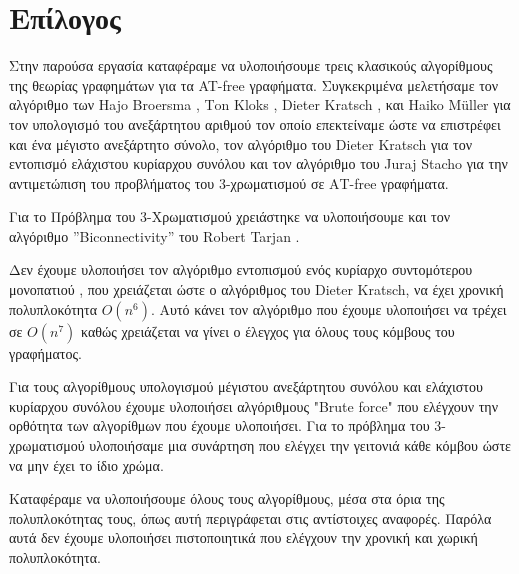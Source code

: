 \chapter{Επίλογος}
\label{ch:Conclusion}

Στην παρούσα εργασία καταφέραμε να υλοποιήσουμε τρεις κλασικούς αλγορίθμους της θεωρίας γραφημάτων για 
τα AT-free γραφήματα. Συγκεκριμένα μελετήσαμε τον αλγόριθμο των Ηajo Βroersma , Τon Κloks , Dieter Kratsch , και Ηaiko Μüller\cite{at-free-independent-sets} για τον υπολογισμό του ανεξάρτητου αριθμού τον οποίο επεκτείναμε ώστε να επιστρέφει και ένα μέγιστο ανεξάρτητο σύνολο, τον αλγόριθμο του Dieter Kratsch\cite{at-free-domination} για τον εντοπισμό ελάχιστου κυρίαρχου συνόλου και τον αλγόριθμο του Juraj Stacho\cite{at-free-3-colouring}  για την αντιμετώπιση του προβλήματος του 3-χρωματισμού σε ΑΤ-free γραφήματα.

Για το Πρόβλημα του 3-Χρωματισμού χρειάστηκε να υλοποιήσουμε και τον αλγόριθμο ”Biconnectivity” του Robert Tarjan \cite{tarjan-depth-first-search}.

Δεν έχουμε υλοποιήσει τον αλγόριθμο εντοπισμού ενός κυρίαρχο συντομότερου
μονοπατιού \cite{corneil-olariu-stewart-asteroidal-triple-free-graphs}, που χρειάζεται ώστε ο αλγόριθμος του Dieter Kratsch\cite{at-free-domination}, να έχει χρονική πολυπλοκότητα $O(n^6)$. Αυτό κάνει τον αλγόριθμο που έχουμε υλοποιήσει να τρέχει σε $O(n^7)$ καθώς χρειάζεται να γίνει ο έλεγχος για όλους τους κόμβους του γραφήματος. 

Για τους αλγορίθμους υπολογισμού μέγιστου ανεξάρτητου συνόλου και ελάχιστου κυρίαρχου συνόλου έχουμε υλοποιήσει αλγόριθμους "Brute force" που ελέγχουν την ορθότητα των αλγορίθμων που έχουμε υλοποιήσει. 
Για το πρόβλημα του 3-χρωματισμού υλοποιήσαμε μια συνάρτηση που ελέγχει την γειτονιά κάθε κόμβου ώστε να μην έχει το ίδιο χρώμα.

Καταφέραμε να υλοποιήσουμε όλους τους αλγορίθμους, μέσα στα όρια της πολυπλοκότητας τους, όπως αυτή περιγράφεται στις αντίστοιχες αναφορές. Παρόλα αυτά δεν έχουμε υλοποιήσει πιστοποιητικά που ελέγχουν την χρονική και χωρική πολυπλοκότητα.     